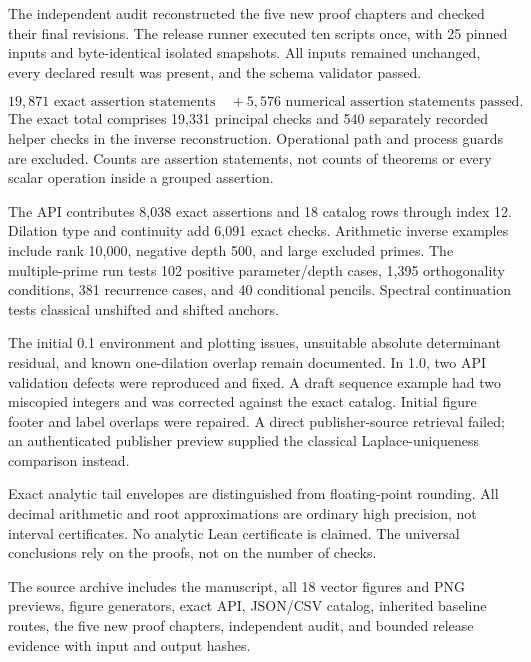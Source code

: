 The independent audit reconstructed the five new proof chapters and checked
their final revisions. The release runner executed ten scripts once, with
25 pinned inputs and byte-identical isolated snapshots. All inputs remained
unchanged, every declared result was present, and the schema validator passed.

\[
\boxed{19{,}871\text{ exact assertion statements}\quad+
5{,}576\text{ numerical assertion statements passed}.}
\]
The exact total comprises 19,331 principal checks and 540 separately recorded
helper checks in the inverse reconstruction. Operational path and process
guards are excluded. Counts are assertion statements, not counts of theorems
or every scalar operation inside a grouped assertion.

The API contributes 8,038 exact assertions and 18 catalog rows through index
12. Dilation type and continuity add 6,091 exact checks. Arithmetic inverse
examples include rank 10,000, negative depth 500, and large excluded primes.
The multiple-prime run tests 102 positive parameter/depth cases, 1,395
orthogonality conditions, 381 recurrence cases, and 40 conditional pencils.
Spectral continuation tests classical unshifted and shifted anchors.

The initial 0.1 environment and plotting issues, unsuitable absolute
determinant residual, and known one-dilation overlap remain documented.
In 1.0, two API validation defects were reproduced and fixed. A draft
sequence example had two miscopied integers and was corrected against the
exact catalog. Initial figure footer and label overlaps were repaired.
A direct publisher-source retrieval failed; an authenticated publisher
preview supplied the classical Laplace-uniqueness comparison instead.

Exact analytic tail envelopes are distinguished from floating-point rounding.
All decimal arithmetic and root approximations are ordinary high precision,
not interval certificates. No analytic Lean certificate is claimed.
The universal conclusions rely on the proofs, not on the number of checks.

The source archive includes the manuscript, all 18 vector figures and PNG
previews, figure generators, exact API, JSON/CSV catalog, inherited baseline
routes, the five new proof chapters, independent audit, and bounded release
evidence with input and output hashes.

